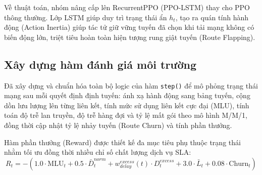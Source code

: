 \documentclass[11pt,a4paper]{article}
\begin{document}
Về thuật toán, nhóm nâng cấp lên RecurrentPPO (PPO-LSTM) thay cho PPO thông thường. Lớp LSTM giúp duy trì trạng thái ẩn $h_t$, tạo ra quán tính hành động (Action Inertia) giúp tác tử giữ vững tuyến đã chọn khi tải mạng không có biến động lớn, triệt tiêu hoàn toàn hiện tượng rung giật tuyến (Route Flapping).

\subsection{Xây dựng hàm đánh giá môi trường}
Đã xây dựng và chuẩn hóa toàn bộ logic của hàm \texttt{step()} để mô phỏng trạng thái mạng sau mỗi quyết định định tuyến: ánh xạ hành động sang bảng tuyến, cộng dồn lưu lượng lên từng liên kết, tính mức sử dụng liên kết cực đại (MLU), tính toán độ trễ lan truyền, độ trễ hàng đợi và tỷ lệ mất gói theo mô hình M/M/1, đồng thời cập nhật tỷ lệ nhảy tuyến (Route Churn) và tính phần thưởng.

Hàm phần thưởng (Reward) được thiết kế đa mục tiêu phụ thuộc trạng thái nhằm tối ưu đồng thời nhiều chỉ số chất lượng dịch vụ SLA:
\begin{equation}
    R_t = -\left( 1.0 \cdot \text{MLU}_t + 0.5 \cdot \bar{D}_t^{norm} + w_{delay}^{excess}(t) \cdot D_t^{excess} + 3.0 \cdot \bar{L}_t + 0.08 \cdot \text{Churn}_t \right)
\end{equation}
\end{document}
